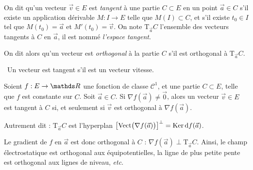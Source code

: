 \begin{defn}
	On dit qu'un vecteur $\vec{v} \in E$ est \textit{tangent} à une partie $C \subset E$ en un point $\vec{a} \in C$ s'il existe un application dérivable $M : I \to E$ telle que $M(I) \subset C$, et s'il existe $t_0 \in I$ tel que $M(t_0) = \vec{a}$ et $M'(t_0) = \vec{v}$.
	On note $\mathrm{T}_{\vec{a}}C$ l'ensemble des vecteurs tangents à $C$ en $\vec{a}$, il est nommé \textit{l'espace tangent}.

	On dit alors qu'un vecteur est \textit{orthogonal} à la partie $C$ s'il est orthogonal à $\mathrm{T}_{\vec{a}}C$.
\end{defn}

\begin{center}
	\guillemotleft~Un vecteur est tangent s'il est un vecteur vitesse.~\guillemotright
\end{center}

\begin{thm}[admis]
	Soient $f: E \to \R$ une fonction de classe $\mathcal{C}^1$, et une partie $C \subset E$, telle que $f$ est constante sur $C$.
	Soit $\vec{a} \in C$.
	Si $\nabla f(\vec{a}) \neq \vec{0}$, alors un vecteur $\vec{v} \in E$ est tangent à $C$ si, et seulement si $\vec{v}$ est orthogonal à $\nabla f(\vec{a})$.

	Autrement dit : $\mathrm{T}_{\vec{a}}C$ est l'hyperplan $\big[\!\operatorname{Vect}\!\big(\nabla f(\vec{a})\big)\big]^\perp = \operatorname{Ker} \mathrm{d}f(\vec{a})$.
\end{thm}

Le gradient de $f$ en $\vec{a}$ est donc orthogonal à $C$ : $\nabla f(\vec{a}) \perp \mathrm{T}_{\vec{a}}C$. Ainsi, le champ électrostatique est orthogonal aux équipotentielles, la ligne de plus petite pente est orthogonal aux lignes de niveau, \textit{etc}.

